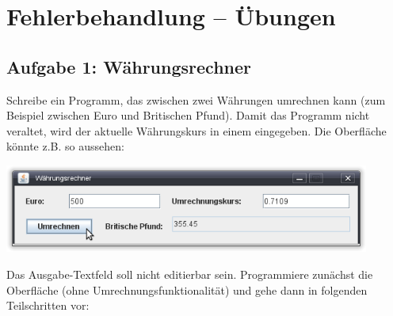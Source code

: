 \clearpage

\rehead[]{\textcolor{lightblue}{AvHG, Inf, My}}
\lohead[]{\textcolor{lightblue}{AvHG, Inf, My}}

\section{Fehlerbehandlung -- Übungen}

\subsection{Aufgabe 1: Währungsrechner}

Schreibe ein Programm, das zwischen zwei Währungen umrechnen kann (zum Beispiel
zwischen Euro und Britischen Pfund). Damit das Programm nicht veraltet, wird der
aktuelle Währungskurs in einem  eingegeben. Die Oberfläche
könnte z.B. so aussehen:

\begin{center}
\includegraphics[width=0.9\textwidth]{./inf/SEKII/25_Java_Exceptions/Waehrungsrechner.png}
\end{center}

Das Ausgabe-Textfeld soll nicht editierbar sein. Programmiere zunächst die
Oberfläche (ohne Umrechnungsfunktionalität) und gehe dann in folgenden
Teilschritten vor:

